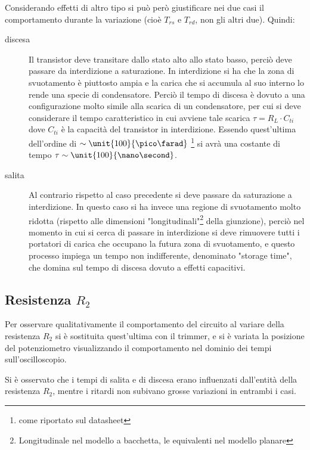 \documentclass[10pt,a4paper]{article}
\begin{document}
Considerando effetti di altro tipo si può però giustificare nei due casi il comportamento durante la variazione (cioè $T_{rs}$ e $T_{rd}$, non gli altri due). Quindi:
\begin{description}
\item[discesa] Il transistor deve transitare dallo stato alto allo stato basso, perciò deve passare da interdizione a saturazione. In interdizione si ha che la zona di svuotamento è piuttosto ampia e la carica che si accumula al suo interno lo rende una specie di condensatore. Perciò il tempo di discesa è dovuto a una configurazione molto simile alla scarica di un condensatore, per cui si deve considerare il tempo caratteristico in cui avviene tale scarica $\tau = R_L \cdot C_{ti}$ dove $C_{ti}$ è la capacità del transistor in interdizione. Essendo quest'ultima dell'ordine di $\sim \unit{100}{\pico\farad}$ \footnote{come riportato sul datasheet} si avrà una costante di tempo $\tau \sim \unit{100}{\nano\second}$.

\item[salita] Al contrario rispetto al caso precedente si deve passare da saturazione a interdizione. In questo caso si ha invece una regione di svuotamento molto ridotta (rispetto alle dimensioni "longitudinali"\footnote{Longitudinale nel modello a bacchetta, le equivalenti nel modello planare} della giunzione), perciò nel momento in cui si cerca di passare in interdizione si deve rimuovere tutti i portatori di carica che occupano la futura zona di svuotamento, e questo processo impiega un tempo non indifferente, denominato "storage time", che domina sul tempo di discesa dovuto a effetti capacitivi.
\end{description}


\subsection{Resistenza $R_2$}
Per osservare qualitativamente il comportamento del circuito al variare della resistenza $R_2$ si è sostituita quest'ultima con il trimmer, e si è variata la posizione del potenziometro visualizzando il comportamento nel dominio dei tempi sull'oscilloscopio.

Si è osservato che i tempi di salita e di discesa erano influenzati dall'entità della resistenza $R_2$, mentre i ritardi non subivano grosse variazioni in entrambi i casi.
\end{document}
